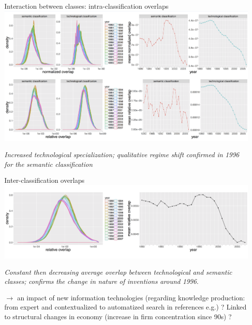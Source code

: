 \documentclass{beamer}
\begin{document}
\begin{frame}{Interaction between classes: intra-classification overlaps}
   \centering
    \includegraphics[width=\textwidth]{figures/Fig7.png}
    
    \medskip

    
    \textit{Increased technological specialization; qualitative regime shift confirmed in 1996 for the semantic classification}
    
    
\end{frame}

\begin{frame}{Inter-classification overlaps}
   \centering
    \includegraphics[width=\textwidth]{figures/Fig8.png}
    
    \medskip

    \textit{Constant then decreasing average overlap between technological and semantic classes; confirms the change in nature of inventions around 1996.} 
    
    \smallskip
    
    $\rightarrow$ an impact of new information technologies (regarding knowledge production: from expert and contextualized to automatized search in references e.g.) ? Linked to structural changes in economy (increase in firm concentration since 90s) ?
    
\end{frame}
\end{document}
